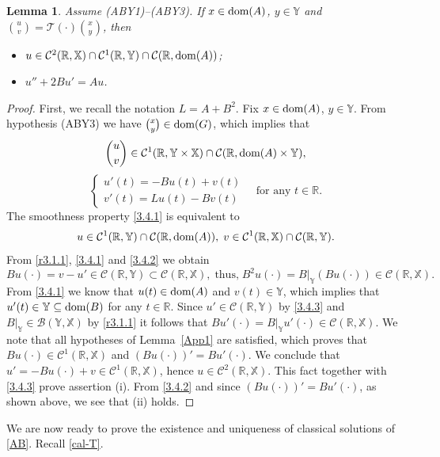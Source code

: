 \documentclass[11pt]{amsart}
\numberwithin{equation}{section}
\newcommand{\RR}{{\mathbb R}}
\newtheorem{lemma}[theorem]{Lemma}
\theoremstyle{remark}
\theoremstyle{definition}
\newcommand\cT{{\mathcal T}}
\newcommand\bX{{\mathbb X}}
\newcommand\bY{{\mathbb Y}}
\newcommand{\dom}{\text{\rm{dom}}}
\begin{document}
\begin{lemma}\label{l3.4}
	Assume \textnormal{(ABY1)--(ABY3)}. If $x \in \dom(A)$, $y \in \bY$ and
	$\binom{u}{v} = \cT(\cdot)\binom{x}{y}$, then
	\begin{itemize}
		\item[(i)] $u \in \mathcal{C}^2(\mathbb{R},\bX) \cap \mathcal{C}^1(\mathbb{R},\bY) \cap \mathcal{C}(\mathbb{R},\dom(A))$;
		\item[(ii)] $u'' + 2Bu' = Au$.
	\end{itemize}
\end{lemma}
\begin{proof} First, we recall the notation $L = A + B^2$. 
	Fix $x \in \dom(A)$, $y \in\bY$. From hypothesis (ABY3) we have $\binom{x}{y} \in \dom(G)$, which implies that
	\begin{equation}\label{3.4.1}
		\binom{u}{v} \in \mathcal{C}^1(\mathbb{R}, \bY\times\bX) \cap \mathcal{C}(\mathbb{R},\dom(A)\times \bY),
	\end{equation}
	\begin{equation}\label{3.4.2}
		\begin{cases} u'(t) = -Bu(t) + v(t) \\ v'(t) = Lu(t) - Bv(t) \end{cases}
		\quad \text{for any } t \in \mathbb{R}. 
	\end{equation}
	The smoothness property \eqref{3.4.1} is equivalent to 
	\begin{equation}\label{3.4.3}
		u \in \mathcal{C}^1(\mathbb{R},\bY) \cap \mathcal{C}(\mathbb{R},\dom(A)),\; v \in \mathcal{C}^1(\mathbb{R},\bX) \cap \mathcal{C}(\mathbb{R},\bY). 
	\end{equation}
	From \eqref{r3.1.1}, \eqref{3.4.1} and \eqref{3.4.2} we obtain
	\begin{equation}\label{3.4.4}
		Bu(\cdot) = v - u' \in \mathcal{C}(\mathbb{R},\bY) \subset \mathcal{C}(\mathbb{R},\bX),\;\mbox{thus,}\;B^2u(\cdot) = B|_\bY(Bu(\cdot)) \in \mathcal{C}(\mathbb{R},\bX).
	\end{equation}
	From \eqref{3.4.1} we know that $u(t)\in\dom(A)$ and $v(t)\in\bY$, which implies that $u'(t)\in\bY\subseteq \dom(B)$ for any $t\in\RR$. Since $u' \in \mathcal{C}(\mathbb{R},\bY)$ by \eqref{3.4.3} and $B|_\bY \in \mathcal{B}(\bY,\bX)$ by \eqref{r3.1.1} it follows that  $Bu'(\cdot) = B|_\bY u'(\cdot) \in \mathcal{C}(\mathbb{R},\bX)$. We note that all hypotheses of Lemma~\ref{App1} are satisfied, which proves that $Bu(\cdot) \in \mathcal{C}^1(\mathbb{R},\bX)$ and $(Bu(\cdot))' = Bu'(\cdot)$. We conclude that $u' = -Bu(\cdot) + v \in \mathcal{C}^1(\mathbb{R},\bX)$, hence $u\in \mathcal{C}^2(\mathbb{R},\bX)$. This fact together with \eqref{3.4.3} prove
	assertion (i). From \eqref{3.4.2} and since $(Bu(\cdot))' = Bu'(\cdot)$, as shown above, we see that (ii) holds.
\end{proof}
We are now ready to prove the existence and uniqueness of classical solutions of \eqref{AB}. Recall \eqref{cal-T}.
\end{document}
